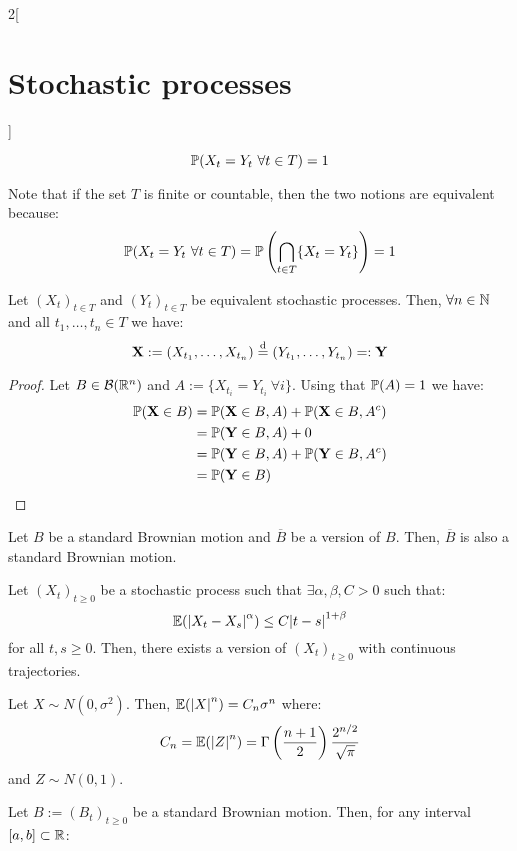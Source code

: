 \documentclass[../../../main_math.tex]{subfiles}
\begin{document}
\begin{multicols}{2}[\section{Stochastic processes}]
\begin{definition}
$$      \mathbb{P}(X_t=Y_t\ \forall t\in T)=1
    $$
  \end{definition}
  \begin{remark}
    Note that if the set $T$ is finite or countable, then the two notions are equivalent because:
    $$
      \mathbb{P}(X_t=Y_t\ \forall t\in T)=\mathbb{P}\left(\bigcap_{t\in T} \{X_t=Y_t\}\right)=1
    $$
  \end{remark}
  \begin{proposition}
    Let $({X_t})_{t\in T}$ and $({Y_t})_{t\in T}$ be equivalent stochastic processes. Then, $\forall n\in\mathbb{N}$ and all $t_1,\ldots,t_n\in T$ we have:
    $$
      \boldsymbol{\mathrm{X}}:=(X_{t_1},\ldots,X_{t_n})\overset{\mathrm{d}}{=} (Y_{t_1},\ldots,Y_{t_n})=:\boldsymbol{\mathrm{Y}}
    $$
  \end{proposition}
  \begin{proof}
    Let $B\in\mathcal{B}(\mathbb{R}^n)$ and $A:=\{ X_{t_i} = Y_{t_i}\ \forall i\}$. Using that $\mathbb{P}(A)=1$ we have:
    \begin{align*}
      \mathbb{P}(\boldsymbol{\mathrm{X}}\in B) & =\mathbb{P}(\boldsymbol{\mathrm{X}}\in B, A)+ \mathbb{P}(\boldsymbol{\mathrm{X}}\in B, A^c) \\
                         & =\mathbb{P}(\boldsymbol{\mathrm{Y}}\in B, A)+ 0                       \\
                         & =\mathbb{P}(\boldsymbol{\mathrm{Y}}\in B, A)+ \mathbb{P}(\boldsymbol{\mathrm{Y}}\in B, A^c) \\
                         & =\mathbb{P}(\boldsymbol{\mathrm{Y}}\in B)
    \end{align*}
  \end{proof}
  \begin{corollary}
    Let $B$ be a standard Brownian motion and $\overline{B}$ be a version of $B$. Then, $\overline{B}$ is also a standard Brownian motion.
  \end{corollary}
  \begin{theorem}
    Let ${(X_t)}_{t\geq 0}$ be a stochastic process such that $\exists \alpha,\beta, C>0$ such that:
    $$
      \mathbb{E}(\abs{X_t-X_s}^\alpha)\leq C\abs{t-s}^{1+\beta}
    $$
    for all $t,s\geq 0$. Then, there exists a version of ${(X_t)}_{t\geq 0}$ with continuous trajectories.
  \end{theorem}
  \begin{lemma}
    Let $X\sim N(0,\sigma^2)$. Then, $\mathbb{E}(\abs{X}^n)=C_n\sigma^n$ where:
    $$
      C_n=\mathbb{E}(\abs{Z}^n)=\Gamma\left(\frac{n+1}{2}\right)\frac{2^{n/2}}{\sqrt{\pi}}
    $$
    and $Z\sim N(0,1)$.
  \end{lemma}
  \begin{proposition}
    Let $B:= {(B_t)}_{t\geq 0}$ be a standard Brownian motion. Then, for any interval $[a,b]\subset \mathbb{R}$:

\end{proposition}
\end{multicols}
\end{document}

